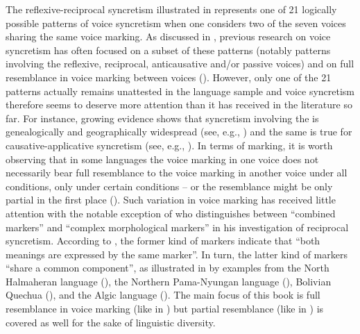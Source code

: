 The reflexive-reciprocal syncretism illustrated in  represents one of 21 logically possible patterns of voice syncretism when one considers two of the seven voices sharing the same voice marking. As discussed in , previous research on voice syncretism has often focused on a subset of these patterns (notably patterns involving the reflexive, reciprocal, anticausative and/or passive voices) and on full resemblance in voice marking between voices (). However, only one of the 21 patterns actually remains unattested in the language sample and voice syncretism therefore seems to deserve more attention than it has received in the literature so far. For instance, growing evidence shows that syncretism involving the  is genealogically and geographically widespread (see, e.g., \citealt{janic:2010}) and the same is true for causative-applicative syncretism (see, e.g., \citealt{malchukov:2017}). In terms of marking, it is worth observing that in some languages the voice marking in one voice does not necessarily bear full resemblance to the voice marking in another voice under all conditions, only under certain conditions -- or the resemblance might be only partial in the first place (). Such variation in voice marking has received little attention with the notable exception of \citet[243f.]{nedjalkov:2007d} who distinguishes between “combined markers” and “complex morphological markers” in his investigation of reciprocal syncretism. According to \citeauthor{nedjalkov:2007d}, the former kind of markers indicate that “both meanings are expressed by the same marker”. In turn, the latter kind of markers “share a common component”, as illustrated in  by examples from the North Halmaheran language  (), the Northern Pama-Nyungan language  (), Bolivian Quechua (), and the Algic language  (). The main focus of this book is full resemblance in voice marking (like in ) but partial resemblance (like in ) is covered as well for the sake of linguistic diversity.

